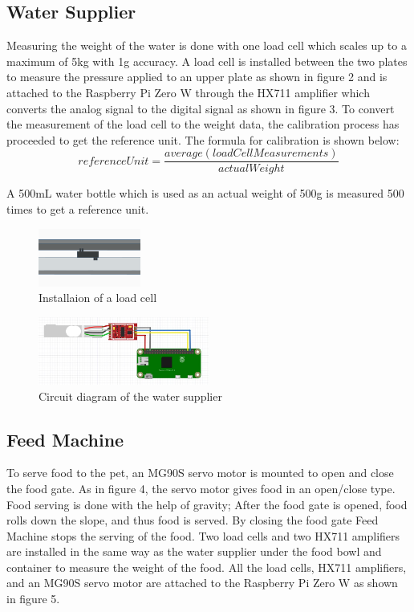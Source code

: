 ﻿\documentclass[conference]{IEEEtran}
\begin{document}
\subsection{Water Supplier}
Measuring the weight of the water is done with one load cell which scales up to a maximum of 5kg with 1g accuracy.
A load cell is installed between the two plates to measure the pressure applied to an upper plate as shown in figure 2 and is attached to the Raspberry Pi Zero W through the HX711 amplifier which converts the analog signal to the digital signal as shown in figure 3.
To convert the measurement of the load cell to the weight data, the calibration process has proceeded to get the reference unit.
The formula for calibration is shown below:
\[
	referenceUnit = \frac{average(loadCellMeasurements)}{actualWeight}
\]

A 500mL water bottle which is used as an actual weight of 500g is measured 500 times to get a reference unit.

\begin{figure}[htbp]
\centerline{\includegraphics[width=0.3\textwidth]{./images/load-cell.png}}
\caption{Installaion of a load cell}
\label{fig}
\end{figure}

\begin{figure}[htbp]
\centerline{\includegraphics[width=0.5\textwidth]{./images/water supplier circuit.jpg}}
\caption{Circuit diagram of the water supplier}
\label{fig}
\end{figure}

\subsection{Feed Machine}
To serve food to the pet, an MG90S servo motor is mounted to open and close the food gate.
As in figure 4, the servo motor gives food in an open/close type.
Food serving is done with the help of gravity; After the food gate is opened, food rolls down the slope, and thus food is served.
By closing the food gate Feed Machine stops the serving of the food.
Two load cells and two HX711 amplifiers are installed in the same way as the water supplier under the food bowl and container to measure the weight of the food.
All the load cells, HX711 amplifiers, and an MG90S servo motor are attached to the Raspberry Pi Zero W as shown in figure 5.
\end{document}
